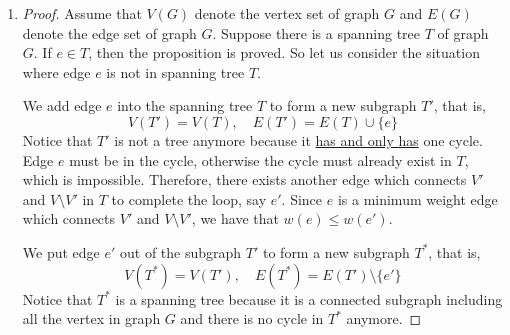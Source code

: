\documentclass[12pt,a4paper]{article}
\theoremstyle{definition}
\begin{document}
\begin{enumerate}
\begin{enumerate}
\begin{proof}
    Now let us consider a subgraph $T^* \stackrel{\Delta}{=} T'' \cup (T \setminus T')$. Basically we just replace $T'$ with $T''$ in spanning tree $T$, so $T^*$ includes all the vertices in graph $G$. Since the vertex sets of $T''$ and $T'$ are exactly the same, according to the observation, we can know that for every spanning tree $T_i\ (i = 1,2,\cdots, k)$, there exists only one edge between $T_i$ and $T''$ in spanning tree $T^*$. Thus, $T^*$ is a spanning tree of graph $G$.

    Let us evaluate the total weight of $T^*$. According to Equation \eqref{eq3-1}, we can make the following derivations.
    \begin{displaymath}
    \sum_{e \in E(T^*)} w(e) = \sum_{e \in E(T'')} w(e) + \sum_{e \in E(T \setminus T')} w(e) < \sum_{e \in E(T')} w(e) + \sum_{e \in E(T \setminus T')} w(e) = \sum_{e \in E(T)} w(e)
    \end{displaymath}

    Therefore, we have a spanning tree $T^*$ of graph $G$ whose total weight is less than the minimum spanning tree $T$ of graph $G$, which contradicts with the definition of minimum spanning tree.

    Hence, $T'$ is a minimum spanning tree of $G'$ if $T'$ is connected.
    \end{proof}

    \item
    \begin{proof}
    Assume that $V(G)$ denote the vertex set of graph $G$ and $E(G)$ denote the edge set of graph $G$. Suppose there is a spanning tree $T$ of graph $G$. If $e \in T$, then the proposition is proved. So let us consider the situation where edge $e$ is not in spanning tree $T$.

    We add edge $e$ into the spanning tree $T$ to form a new subgraph $T'$, that is,
    \begin{displaymath}
    V(T') = V(T), \quad E(T') = E(T) \cup \{e\}
    \end{displaymath}
    Notice that $T'$ is not a tree anymore because it \underline{has and only has} one cycle. Edge $e$ must be in the cycle, otherwise the cycle must already exist in $T$, which is impossible. Therefore, there exists another edge which connects $V'$ and $V \setminus V'$ in $T$ to complete the loop, say $e'$. Since $e$ is a minimum weight edge which connects $V'$ and $V \setminus V'$, we have that $w(e) \leq w(e')$.

    We put edge $e'$ out of the subgraph $T'$ to form a new subgraph $T^*$, that is,
    \begin{displaymath}
    V(T^*) = V(T'), \quad E(T^*) = E(T') \setminus \{e'\}
    \end{displaymath}
    Notice that $T^*$ is a spanning tree because it is a connected subgraph including all the vertex in graph $G$ and there is no cycle in $T^*$ anymore.


\end{proof}
\end{enumerate}
\end{enumerate}
\end{document}
